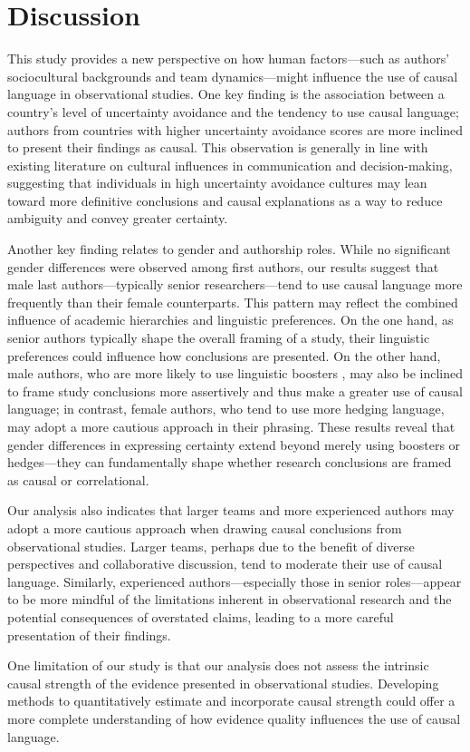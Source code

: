 \section{Discussion}


This study provides a new perspective on how human factors—such as authors'
sociocultural backgrounds and team dynamics—might influence the use of causal
language in observational studies. One key finding is the association
between a country's level of uncertainty avoidance \cite{hofstede2010} and the
tendency to use causal language; authors from countries with higher
uncertainty avoidance scores are more inclined to present their findings
as causal. This observation is generally in line with existing literature on
cultural influences in communication and decision-making, suggesting that
individuals in high uncertainty avoidance cultures may lean toward more
definitive conclusions and causal explanations as a way to reduce ambiguity and
convey greater certainty.

Another key finding relates to gender and authorship roles. While no significant
gender differences were observed among first authors, our results suggest that
male last authors—typically senior researchers—tend to use causal language
more frequently than their female counterparts. 
This pattern may reflect the combined influence of academic hierarchies and linguistic preferences.
On the one hand, as senior authors typically shape the overall framing
of a study, their linguistic preferences could influence how conclusions are presented.
On the other hand, male authors, who are more likely to use linguistic boosters 
\cite{tannen1995,nasri2018projecting},
may also be inclined to frame study conclusions more assertively and thus make a
greater use of causal language; in contrast, female authors, who tend to
use more hedging language, may adopt a more cautious approach in their
phrasing. 
These results reveal that gender differences in expressing certainty
extend beyond merely using boosters or hedges—they can fundamentally shape
whether research conclusions are framed as causal or correlational.


Our analysis also indicates that larger teams and more experienced authors may adopt a
more cautious approach when drawing causal conclusions from observational
studies. Larger teams, perhaps due to the benefit of diverse perspectives and
collaborative discussion, tend to moderate their use of causal language.
Similarly, experienced authors—especially those in senior roles—appear to be
more mindful of the limitations inherent in observational research and the
potential consequences of overstated claims, leading to a more careful
presentation of their findings.

One limitation of our study is that our analysis does not assess the intrinsic causal strength
of the evidence presented in observational studies. 
Developing methods to quantitatively estimate and incorporate causal strength could offer a more
complete understanding of how evidence quality influences the use of causal language.
